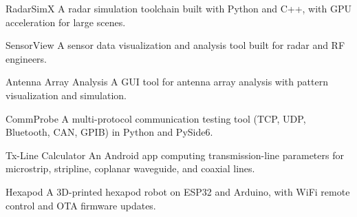 \begin{cventries}

    \cventry
        {RadarSimX}
        {}
        {}
        {}
        {{\cvdescfont A radar simulation toolchain built with Python and C++, with GPU acceleration for large scenes.}}

    \cventry
        {SensorView}
        {}
        {}
        {}
        {{\cvdescfont A sensor data visualization and analysis tool built for radar and RF engineers.}}

    \cventry
        {Antenna Array Analysis}
        {}
        {}
        {}
        {{\cvdescfont A GUI tool for antenna array analysis with pattern visualization and simulation.}}

    \cventry
        {CommProbe}
        {}
        {}
        {}
        {{\cvdescfont A multi-protocol communication testing tool (TCP, UDP, Bluetooth, CAN, GPIB) in Python and PySide6.}}

    \cventry
        {Tx-Line Calculator}
        {}
        {}
        {}
        {{\cvdescfont An Android app computing transmission-line parameters for microstrip, stripline, coplanar waveguide, and coaxial lines.}}

    \cventry
        {Hexapod}
        {}
        {}
        {}
        {{\cvdescfont A 3D-printed hexapod robot on ESP32 and Arduino, with WiFi remote control and OTA firmware updates.}}

\end{cventries}


